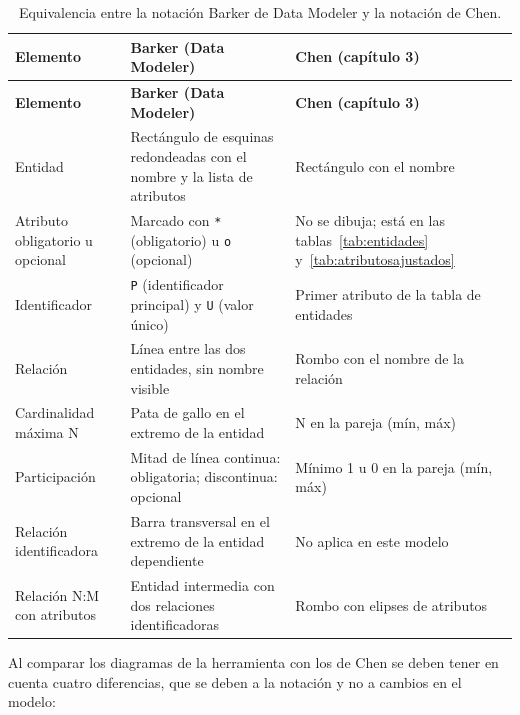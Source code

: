 {\singlespacing
\begin{longtable}{L{4.0cm} L{5.4cm} L{5.0cm}}
\caption{Equivalencia entre la notación Barker de Data Modeler y la notación de Chen.}
\label{tab:barker}\\
\toprule
\textbf{Elemento} & \textbf{Barker (Data Modeler)} & \textbf{Chen (capítulo 3)} \\
\midrule
\endfirsthead
\toprule
\textbf{Elemento} & \textbf{Barker (Data Modeler)} & \textbf{Chen (capítulo 3)} \\
\midrule
\endhead
\bottomrule
\endfoot
Entidad & Rectángulo de esquinas redondeadas con el nombre y la lista de atributos & Rectángulo con el nombre \\
Atributo obligatorio u opcional & Marcado con \texttt{*} (obligatorio) u \texttt{o} (opcional) & No se dibuja; está en las tablas~\ref{tab:entidades} y~\ref{tab:atributosajustados} \\
Identificador & \texttt{P} (identificador principal) y \texttt{U} (valor único) & Primer atributo de la tabla de entidades \\
Relación & Línea entre las dos entidades, sin nombre visible & Rombo con el nombre de la relación \\
Cardinalidad máxima N & Pata de gallo en el extremo de la entidad & N en la pareja (mín, máx) \\
Participación & Mitad de línea continua: obligatoria; discontinua: opcional & Mínimo 1 u 0 en la pareja (mín, máx) \\
Relación identificadora & Barra transversal en el extremo de la entidad dependiente & No aplica en este modelo \\
Relación N:M con atributos & Entidad intermedia con dos relaciones identificadoras & Rombo con elipses de atributos \\
\end{longtable}
\par}

Al comparar los diagramas de la herramienta con los de Chen se deben
tener en cuenta cuatro diferencias, que se deben a la notación y no a
cambios en el modelo:

